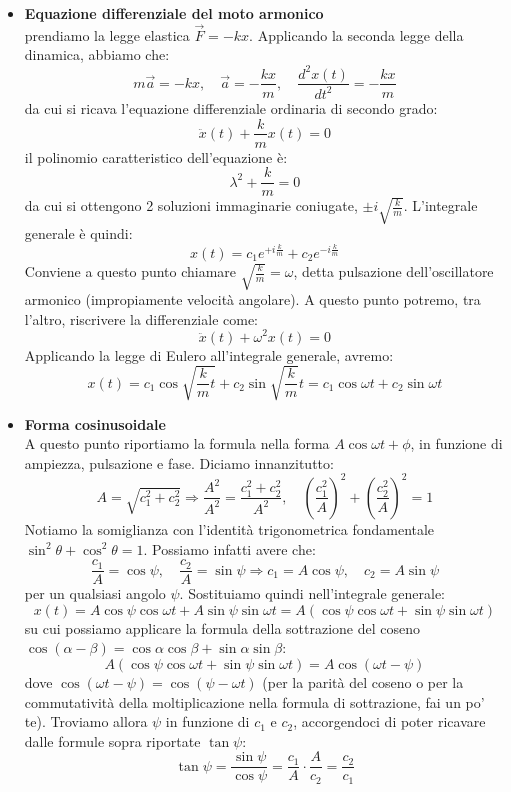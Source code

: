 \documentclass[a4paper,12pt]{article}
\begin{document}
\begin{itemize}
  \item \textbf{Equazione differenziale del moto armonico} \\
prendiamo la legge elastica $\vec{F} = -kx$. Applicando la seconda legge
della dinamica, abbiamo che:
$$ m\vec{a} = -kx, \quad \vec{a} = -\frac{kx}{m}, \quad \frac{d^2x(t)}{dt^2} = -\frac{kx}{m} $$
da cui si ricava l'equazione differenziale ordinaria di secondo grado:
$$ \ddot{x}(t) +\frac{k}{m}x(t) = 0 $$
il polinomio caratteristico dell'equazione è:
$$ \lambda^2 + \frac{k}{m} = 0 $$
da cui si ottengono 2 soluzioni immaginarie coniugate, $\pm i\sqrt{\frac{k}{m}}$. L'integrale generale è quindi:
$$ x(t) = c_1e^{+i\frac{k}{m}} + c_2e^{-i\frac{k}{m}} $$
Conviene a questo punto chiamare $\sqrt{\frac{k}{m}} = \omega$, detta pulsazione dell'oscillatore armonico (impropiamente
velocità angolare). A questo punto potremo, tra l'altro, riscrivere la differenziale come:
$$ \ddot{x}(t) + \omega^2x(t) = 0 $$
Applicando la legge di Eulero all'integrale generale, avremo:
$$ x(t) = c_1\cos{\sqrt{\frac{k}{m} t}} + c_2\sin{\sqrt{\frac{k}{m}} t} = c_1\cos{\omega t} + c_2\sin{\omega t} $$
 \item \textbf{Forma cosinusoidale} \\
A questo punto riportiamo la formula nella forma $A\cos{\omega t + \phi}$, in funzione di ampiezza, pulsazione e fase.
Diciamo innanzitutto:
$$ A = \sqrt{c_1^2 + c_2^2} \Rightarrow \frac{A^2}{A^2} = \frac{c_1^2+c_2^2}{A^2}, \quad (\frac{c_1^2}{A})^2 + (\frac{c_2^2}{A})^2 = 1 $$
Notiamo la somiglianza con l'identità trigonometrica fondamentale $\sin^2{\theta} + \cos^2{\theta} = 1$. Possiamo infatti
avere che:
$$ \frac{c_1}{A} = \cos{\psi}, \quad \frac{c_2}{A} = \sin{\psi} \Rightarrow c_1 = A\cos{\psi}, \quad c_2 = A\sin{\psi} $$
per un qualsiasi angolo $\psi$. Sostituiamo quindi nell'integrale generale:
$$ x(t) = A\cos{\psi}\cos{\omega t} + A\sin{\psi}\sin{\omega t} = A(\cos{\psi}\cos{\omega t} + \sin{\psi}\sin{\omega t}) $$
su cui possiamo applicare la formula della sottrazione del coseno $\cos{(\alpha - \beta)} = \cos{\alpha}\cos{\beta} + \sin{\alpha}{\sin{\beta}}$:
$$ A(\cos{\psi}\cos{\omega t} + \sin{\psi}\sin{\omega t}) = A\cos{(\omega t - \psi)} $$
dove $ \cos{(\omega t - \psi)} = \cos{(\psi - \omega t)}$ (per la parità del coseno o per la commutatività della moltiplicazione
nella formula di sottrazione, fai un po' te). Troviamo allora $\psi$ in funzione di $c_1$ e $c_2$, accorgendoci di poter
ricavare dalle formule sopra riportate $\tan{\psi}$:
$$ \tan{\psi} = \frac{\sin{\psi}}{\cos{\psi}} = \frac{c_1}{A} \cdot \frac{A}{c_2} = \frac{c_2}{c_1} $$

\end{itemize}
\end{document}
